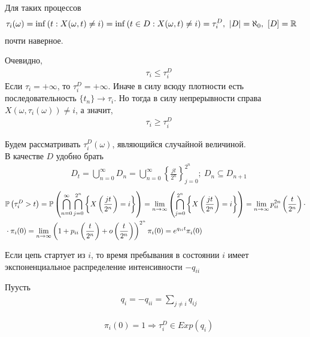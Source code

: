 \begin{Prop}
    Для таких процессов
    \begin{align*}
      & \tau_i(\omega) = \inf\left( t: X(\omega, t) \neq i \right) = \inf\left( t \in D: X(\omega, t) \neq i \right) = \tau_i^D, \ \left| D \right| = \aleph_0, \ [D] = \mathbb{R}
    \end{align*}
    почти наверное.
\end{Prop}
\begin{Proof}
    Очевидно,
    \begin{align*}
      & \tau_i \leq \tau_i^D
    \end{align*}
    Если $\tau_i = +\infty$, то $\tau_i^D = +\infty$. Иначе в силу всюду
    плотности есть последовательность $\{t_n\} \to \tau_i$. Но тогда в силу
    непрерывности справа $X(\omega, \tau_i(\omega)) \neq i$, а значит,
    \begin{align*}
      & \tau_i \geq \tau_i^D
    \end{align*}  
\end{Proof}
Будем рассматривать $\tau_i^D(\omega)$, являющийся случайной величиной.
\\
В качестве $D$ удобно брать
\begin{align*}
  & D_t = \bigcup_{n=0}^\infty D_n = \bigcup_{n=0}^\infty \left\{ \frac{jt}{2^n} \right\}^{2^n}_{j=0}; \ D_n \subseteq D_{n+1}
\end{align*}
\begin{align*}
  & \mathbb{P}\left( \tau_i^D>t \right)  = \mathbb{P}\left( \bigcap_{n=0}^\infty \bigcap_{j=0}^{2^n} \left\{ X\left( \frac{jt}{2^n} \right) = i \right\} \right) = \lim_{n \to \infty}\left( \bigcap_{j=0}^{2^n} \left\{ X\left( \frac{jt}{2^n} \right) = i \right\} \right) = \lim_{n \to \infty} p_{ii}^{2n}\left( \frac{t}{2^n} \right) \cdot \\
  & \cdot \pi_i(0) = \lim_{n \to \infty} \left( 1+p_{ii}\left( \frac{t}{2^n} \right) +o\left( \frac{t}{2^n} \right)\right)^{2^n}\pi_i(0) = e^{q_{ii}t}\pi_i(0)
\end{align*}
\begin{Note}
    Если цепь стартует из $i$, то время пребывания в состоянии $i$ имеет
    экспоненциальное распределение интенсивности $-q_{ii}$
\end{Note}
\begin{Des}
    Пуусть
    \begin{align*}
      & q_i = -q_{ii} = \sum_{j \neq i}q_{ij}
    \end{align*}
\end{Des}
\begin{Note}
    \begin{align*}
      & \pi_i(0) = 1 \Rightarrow \tau_i^D \in Exp(q_i)
    \end{align*}
\end{Note}
